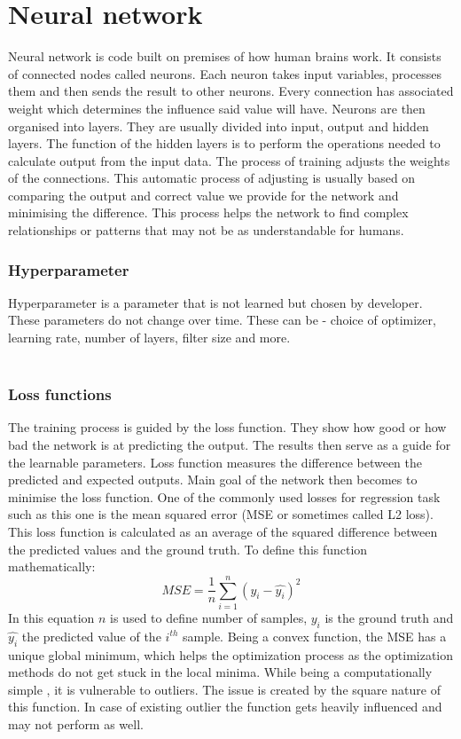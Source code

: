 \section{Neural network}
Neural network is code built on premises of how human brains work. It consists of connected nodes called neurons. Each neuron takes input variables, processes them and then sends the result to other neurons. Every connection has associated weight which determines the influence said value will have.
Neurons are then organised into layers. They are usually divided into input, output and hidden layers. The function of the hidden layers is to perform the operations needed to calculate output from the input data.
The process of training adjusts the weights of the connections. This automatic process of adjusting is usually based on comparing the output and correct value we provide for the network and minimising the difference.
This process helps the network to find complex relationships or patterns that may not  be as understandable for humans.

\subsubsection{Hyperparameter}
Hyperparameter is a parameter that is not learned but chosen by developer.  These parameters do not change over time. These can be - choice of optimizer, learning rate,  number of layers, filter size and more.\\\\
\subsubsection{Loss functions \cite{loss}}
The training process is guided by the loss function. They show how good or how bad the network is at predicting the output. The results then serve as a guide for the learnable parameters. Loss function measures the difference between the predicted and expected outputs. Main goal of the network then becomes to minimise the loss function. One of the commonly used losses for regression task such as this one is the mean squared error (MSE or sometimes called L2 loss). This loss function is calculated as an average of the squared difference between the predicted values and the ground truth. To define this function mathematically:
\begin{equation}
	MSE = \frac{1}{n}\sum_{i=1}^{n}(y_i -  \hat{y_i})^2
\end{equation}
In this equation $n$ is used to define number of samples, $y_i$ is the ground truth and $\hat{y_i}$ the predicted value of the $i^{th}$ sample. Being a convex function, the MSE has a unique global minimum, which helps the optimization process as the optimization methods do not get stuck in the local minima. While being a computationally simple , it is vulnerable to outliers. The issue is created by the square nature of this function. In case of existing outlier the function gets heavily influenced and may not perform as well.
\\
